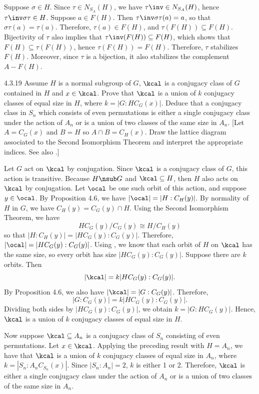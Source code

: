 \begin{sol}
	Suppose $\sigma \in H$.
	Since $\tau \in N_{S_A}(H)$, we have $\tau\inv \in N_{S_A}(H)$, hence $\tau\inv\sigma\tau \in H$.
	Suppose $a \in F(H)$.
	Then $\tau\inv\sigma\tau(a) = a$, so that $\sigma\tau(a) = \tau(a)$.
	Therefore, $\tau(a) \in F(H)$, and $\tau(F(H)) \subseteq F(H)$.
	Bijectivity of $\tau$ also implies that $\tau\inv(F(H)) \subseteq F(H)$, which shows that $F(H) \subseteq \tau(F(H))$, hence $\tau(F(H)) = F(H)$.
	Therefore, $\tau$ stabilizes $F(H)$.
	Moreover, since $\tau$ is a bijection, it also stabilizes the complement $A - F(H)$.
\end{sol}

\begin{exercise}{4.3.19}
	Assume $H$ is a normal subgroup of $G$, $\kcal$ is a conjugacy class of $G$ contained in $H$ and $x \in \kcal$.
	Prove that $\kcal$ is a union of $k$ conjugacy classes of equal size in $H$, where $k = |G : HC_G(x)|$.
	Deduce that a conjugacy class in $S_n$ which consists of even permutations is either a single conjugacy class under the action of $A_n$ or is a union of two classes of the same size in $A_n$. [Let $A = C_G(x)$ and $B = H$ so $A \cap B = C_H(x)$.
	Draw the lattice diagram associated to the Second Isomorphism Theorem and interpret the appropriate indices.
	See also .]
\end{exercise}

\begin{sol}
	Let $G$ act on $\kcal$ by conjugation.
	Since $\kcal$ is a conjugacy class of $G$, this action is transitive.
	Because $H \nsub G$ and $\kcal \subseteq H$, then $H$ also acts on $\kcal$ by conjugation.
	Let $\ocal$ be one such orbit of this action, and suppose $y \in \ocal$.
	By Proposition 4.6, we have $|\ocal| = |H : C_H(y)|$.
	By normality of $H$ in $G$, we have $C_H(y) = C_G(y) \cap H$.
	Using the Second Isomorphism Theorem, we have
	\[
		HC_G(y)/C_G(y) \cong H/C_H(y)
	\]
	so that $|H : C_H(y)| = |HC_G(y) : C_G(y)|$.
	Therefore, $|\ocal| = |HC_G(y) : C_G(y)|$.
	Using , we know that each orbit of $H$ on $\kcal$ has the same size, so every orbit has size $|HC_G(y) : C_G(y)|$.
	Suppose there are $k$ orbits.
	Then
	\[
		|\kcal| = k|HC_G(y) : C_G(y)|.
	\]
	By Proposition 4.6, we also have $|\kcal| = |G : C_G(y)|$.
	Therefore,
	\[
		|G : C_G(y)| = k|HC_G(y) : C_G(y)|.
	\]
	Dividing both sides by $|HC_G(y) : C_G(y)|$, we obtain $k = |G : HC_G(y)|$.
	Hence, $\kcal$ is a union of $k$ conjugacy classes of equal size in $H$.

	Now suppose $\kcal \subseteq A_n$ is a conjugacy class of $S_n$ consisting of even permutations.
	Let $x \in \kcal$.
	Applying the preceding result with $H = A_n$, we have that $\kcal$ is a union of $k$ conjugacy classes of equal size in $A_n$, where $k = |S_n : A_nC_{S_n}(x)|$.
	Since $|S_n : A_n| = 2$, $k$ is either 1 or 2.
	Therefore, $\kcal$ is either a single conjugacy class under the action of $A_n$ or is a union of two classes of the same size in $A_n$.
\end{sol}

